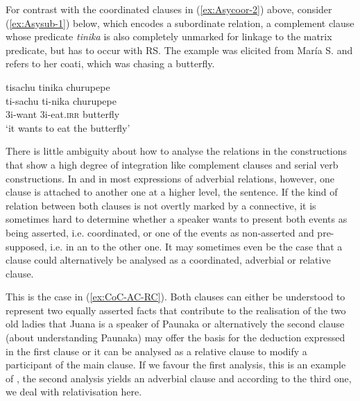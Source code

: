 

For contrast with the coordinated clauses in (\ref{ex:Asycoor-2}) above, consider (\ref{ex:Asysub-1}) below, which encodes a subordinate relation, a complement clause whose predicate \textit{tinika} is also completely unmarked for linkage to the matrix predicate, but has to occur with  RS. The example was elicited from María S. and refers to her coati, which was chasing a butterfly.

 \ea\label{ex:Asysub-1}
\begingl
\glpreamble tisachu tinika churupepe\\
\gla ti-sachu ti-nika churupepe\\
\glb 3i-want 3i-eat.\textsc{irr} butterfly\\
\glft ‘it wants to eat the butterfly’
\endgl
\trailingcitation{[rxx-e150220s-1.20]}
\xe

There is little ambiguity about how to analyse the relations in the constructions that show a high degree of integration like complement clauses and serial verb constructions. In  and in most expressions of adverbial relations, however, one clause is attached to another one at a higher level, the sentence. If the kind of relation between both clauses is not overtly marked by a connective, it is sometimes hard to determine whether a speaker wants to present both events as being asserted, i.e. coordinated, or one of the events as non-asserted and pre-supposed, i.e. in an  to the other one. It may sometimes even be the case that a clause could alternatively be analysed as a coordinated, adverbial or relative clause.

This is the case in (\ref{ex:CoC-AC-RC}). Both clauses can either be understood to represent two equally asserted facts that contribute to the realisation of the two old ladies that Juana is a speaker of Paunaka or alternatively the second clause (about understanding Paunaka) may offer the basis for the deduction expressed in the first clause or it can be analysed as a relative clause to modify a participant of the main clause. If we favour the first analysis, this is an example of , the second analysis yields an adverbial clause and according to the third one, we deal with relativisation here.


